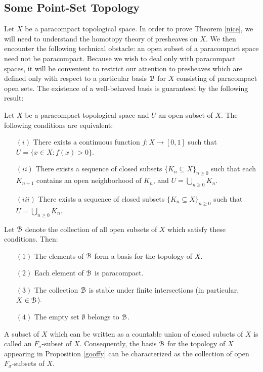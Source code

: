 \subsection{Some Point-Set Topology}

Let $X$ be a paracompact topological space. In order to prove
Theorem \ref{nice}, we will need to understand the homotopy
theory of presheaves on $X$. We then encounter the following
technical obstacle: an open subset of a paracompact space need not
be paracompact. Because we wish to deal only with paracompact
spaces, it will be convenient to restrict our attention to
presheaves which are defined only with respect to a particular
basis $\operatorname{\mathcal{B}}$ for $X$ consisting of paracompact open sets. The existence of a well-behaved basis is guaranteed by the following result:

\begin{proposition}\label{gooffy}
Let $X$ be a paracompact topological space and $U$ an open subset of $X$.
The following conditions are equivalent:
\begin{itemize}
\item[$(i)$] There exists a continuous function $f: X \rightarrow [0,1]$ such that
$U = \{ x \in X: f(x) > 0 \}$.
\item[$(ii)$] There exists a sequence of closed subsets 
$\{ K_{n} \subseteq X \}_{n \geq 0}$ such that each $K_{n+1}$ contains an open neighborhood of
$K_{n}$, and $U = \bigcup_{n \geq 0} K_n$.
\item[$(iii)$] There exists a sequence of closed subsets $\{ K_{n} \subseteq X \}_{n \geq 0}$ such that
$U = \bigcup_{n \geq 0} K_n$.
\end{itemize}
Let $\operatorname{\mathcal{B}}$ denote the collection of all open subsets of $X$ which satisfy these conditions. Then:
\begin{itemize}
\item[$(1)$] The elements of $\operatorname{\mathcal{B}}$ form a basis for the topology of
$X$. 

\item[$(2)$] Each element of $\operatorname{\mathcal{B}}$ is paracompact. 

\item[$(3)$] The
collection $\operatorname{\mathcal{B}}$ is stable under finite intersections (in particular, $X \in \operatorname{\mathcal{B}}$).

\item[$(4)$] The empty set $\emptyset$ belongs to $\operatorname{\mathcal{B}}$.
\end{itemize}
\end{proposition}

\begin{remark}
A subset of $X$ which can be written as a countable union of closed subsets of $X$ is called an
{\it $F_{\sigma}$}-subset of $X$. Consequently, the basis $\operatorname{\mathcal{B}}$ for the topology of $X$ appearing in Proposition \ref{gooffy} can be characterized as the collection of open $F_{\sigma}$-subsets of $X$.
\end{remark}

